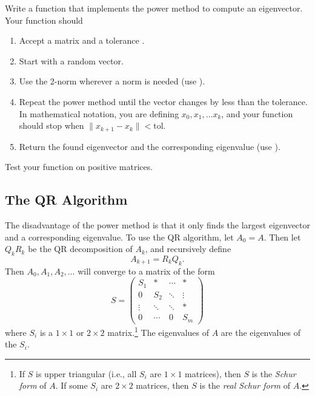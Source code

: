 \begin{problem} %
Write a function that implements the power method to compute an eigenvector. Your function should
\begin{enumerate}
\item Accept a matrix and a tolerance .
\item Start with a random vector.
\item Use the 2-norm wherever a norm is needed (use ).
\item Repeat the power method until the vector changes by less than the tolerance. In mathematical notation, you are defining $x_0, x_1, \ldots x_k$, and your function should stop when $\|x_{k+1}-x_k\| < \text{tol}$.
\item Return the found eigenvector and the corresponding eigenvalue (use ).
\end{enumerate}
Test your function on positive matrices.
\end{problem}

\subsection*{The QR Algorithm} %

The disadvantage of the power method is that it only finds the largest eigenvector and a corresponding eigenvalue.
To use the QR algorithm, let $A_0=A$. Then let $Q_kR_k$ be the QR decomposition of $A_k$, and recursively define
\[
A_{k+1}=R_kQ_k.
\]
Then $A_0, A_1, A_2, \ldots $ will converge to a matrix of the form
\begin{equation*}
\label{eq:Schur form}
S =
     \begin{pmatrix}
          S_1 &* & \cdots & * \\
           0     &S_2  &  \ddots & \vdots \\
           \vdots  & \ddots & \ddots & *  \\
           0 & \cdots & 0 & S_m
    \end{pmatrix}
\end{equation*}
where $S_i$ is a $1\times1$ or $2\times2$ matrix.\footnote{If $S$ is upper triangular (i.e., all $S_i$ are $1\times1$ matrices), then $S$ is the \emph{Schur form} of $A$.
If some $S_i$ are $2\times2$ matrices, then $S$ is the \emph{real Schur form} of $A$.}
The eigenvalues of $A$ are the eigenvalues of the $S_i$.

